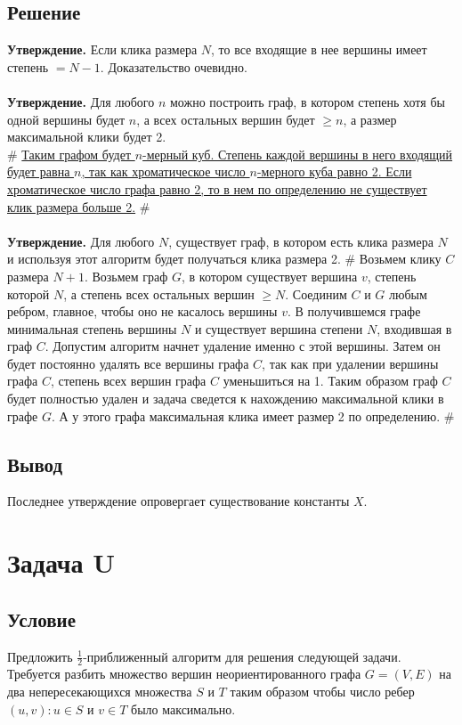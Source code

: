 \documentclass{article}
\begin{document}
\subsection*{Решение} 
\textbf{Утверждение.} Если клика размера $N$, то все входящие в нее вершины имеет степень $= N - 1$. Доказательство очевидно.
\\
\hfill \\
\textbf{Утверждение.} Для любого $n$ можно построить граф, в котором степень хотя бы одной вершины будет $n$, а всех остальных вершин будет $\geq n$, а размер максимальной клики будет 2. \\
\#
\uline{Таким графом будет $n$-мерный куб. Степень каждой вершины в него входящий будет равна $n$, так как хроматическое число $n$-мерного куба равно 2. Если хроматическое число графа равно 2, то в нем по определению не существует клик размера больше 2.}
\#
\\
\hfill \\
\textbf{Утверждение.} Для любого $N$, существует граф, в котором есть клика размера $N$ и используя этот алгоритм будет получаться клика размера 2. 
\#
Возьмем клику $C$ размера $N + 1$. Возьмем граф $G$, в котором существует вершина $v$, степень которой $N$, а степень всех остальных вершин $\geq N$. Соединим $C$ и $G$ любым ребром, главное, чтобы оно не касалось вершины $v$. В получившемся графе минимальная степень вершины $N$ и существует вершина степени $N$, входившая в граф $C$. Допустим алгоритм начнет удаление именно с этой вершины. Затем он будет постоянно удалять все вершины графа $C$, так как при удалении вершины графа $C$, степень всех вершин графа $C$ уменьшиться на 1. Таким образом граф $C$ будет полностью удален и задача сведется к нахождению максимальной клики в графе $G$. А у этого графа максимальная клика имеет размер 2 по определению.
\#

\subsection*{Вывод} Последнее утверждение опровергает существование константы $X$.

\newpage
\section*{Задача  U} 

\subsection*{Условие} 
Предложить $\frac{1}{2}$-приближенный алгоритм для решения следующей задачи. Требуется разбить множество вершин неориентированного графа $G=(V,E)$ на два непересекающихся множества $S$ и $T$ таким образом чтобы число ребер $(u,v): u \in S$ и $v \in T$ было максимально.
\end{document}
